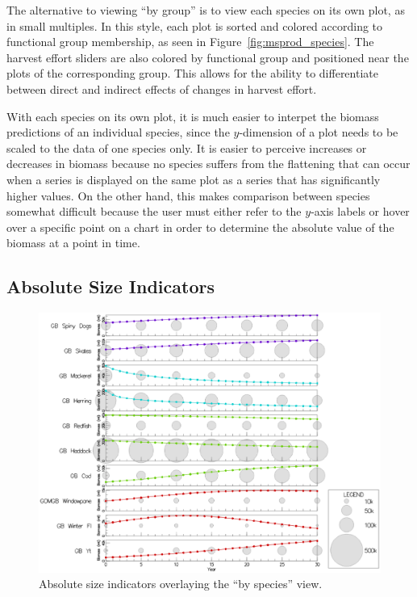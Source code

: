 The alternative to viewing ``by group'' is to view each species on its own plot, as in small multiples.  In this style, each plot is sorted and colored according to functional group membership, as seen in Figure~\ref{fig:msprod_species}.  The harvest effort sliders are also colored by functional group and positioned near the plots of the corresponding group.  This allows for the ability to differentiate between direct and indirect effects of changes in harvest effort.

With each species on its own plot, it is much easier to interpet the biomass predictions of an individual species, since the $y$-dimension of a plot needs to be scaled to the data of one species only.  It is easier to perceive increases or decreases in biomass because no species suffers from the flattening that can occur when a series is displayed on the same plot as a series that has significantly higher values.  On the other hand, this makes comparison between species somewhat difficult because the user must either refer to the $y$-axis labels or hover over a specific point on a chart in order to determine the absolute value of the biomass at a point in time.

\subsection{Absolute Size Indicators}

\begin{figure}[h]
	\centering
	\includegraphics[width=12cm]{figures/eps/msprod_abssize.eps}
	\caption{Absolute size indicators overlaying the ``by species'' view.}
	\label{fig:msprod_abssize}
\end{figure}

